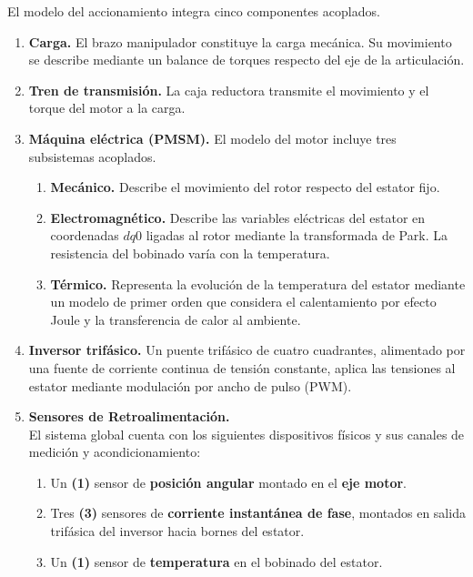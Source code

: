 \documentclass[blue,fullpaper]{ludusofficial}  %
\begin{document}
El modelo del accionamiento integra cinco componentes acoplados.

\begin{enumerate}
    \item \textbf{Carga.} El brazo manipulador constituye la carga mecánica. Su movimiento se describe mediante un balance de torques respecto del eje de la articulación.
    \item \textbf{Tren de transmisión.} La caja reductora transmite el movimiento y el torque del motor a la carga.
    \item \textbf{Máquina eléctrica (PMSM).} El modelo del motor incluye tres subsistemas acoplados.
    \begin{enumerate}
        \item \textbf{Mecánico.} Describe el movimiento del rotor respecto del estator fijo.
        \item \textbf{Electromagnético.} Describe las variables eléctricas del estator en coordenadas $dq0$ ligadas al rotor mediante la transformada de Park. La resistencia del bobinado varía con la temperatura.
        \item \textbf{Térmico.} Representa la evolución de la temperatura del estator mediante un modelo de primer orden que considera el calentamiento por efecto Joule y la transferencia de calor al ambiente.
    \end{enumerate}
    \item \textbf{Inversor trifásico.} Un puente trifásico de cuatro cuadrantes, alimentado por una fuente de corriente continua de tensión constante, aplica las tensiones al estator mediante modulación por ancho de pulso (PWM).
    \item \textbf{Sensores de Retroalimentación.}\\El sistema global cuenta con los siguientes dispositivos físicos y sus canales de medición y acondicionamiento:
    \begin{enumerate}
        \item Un \textbf{(1)} sensor de \textbf{posición angular} montado en el \textbf{eje motor}.
        \item Tres \textbf{(3)} sensores de \textbf{corriente instantánea de fase}, montados en salida trifásica del inversor hacia bornes del estator.
        \item Un \textbf{(1)} sensor de \textbf{temperatura} en el bobinado del estator.
    \end{enumerate}
\end{enumerate}
\end{document}

